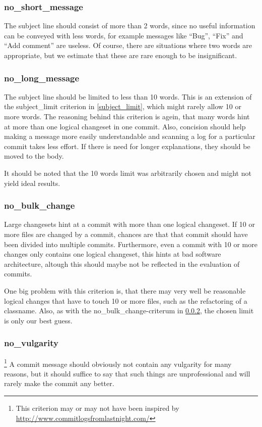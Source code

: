 \subsubsection{no\_short\_message}
\label{subs:no_short_message}
The subject line should consist of more than 2 words, since no useful information can be conveyed with less words, for example messages like ``Bug'', ``Fix'' and ``Add comment'' are useless. Of course, there are situations where two words are appropriate, but we estimate that these are rare enough to be insignificant.

\subsubsection{no\_long\_message}
\label{subs:no_long_message}
The subject line should be limited to less than 10 words. This is an extension of the subject\_limit criterion in \ref{subject_limit}, which might rarely allow 10 or more words. The reasoning behind this criterion is agein, that many words hint at more than one logical changeset in one commit. Also, concision should help making a message more easily understandable and scanning a log for a particular commit takes less effort. If there is need for longer explanations, they should be moved to the body.

It should be noted that the 10 words limit was arbitrarily chosen and might not yield ideal results.

\subsubsection{no\_bulk\_change}
\label{subs:no_bulk_change}
Large changesets hint at a commit with more than one logical changeset. If 10 or more files are changed by a commit, chances are that that commit should have been divided into multiple commits. Furthermore, even a commit with 10 or more changes only contains one logical changeset, this hints at bad software architecture, altough this should maybe not be reflected in the evaluation of commits.

One big problem with this criterion is, that there may very well be reasonable logical changes that have to touch 10 or more files, such as the refactoring of a classname. Also, as with the no\_bulk\_change-criterum in \ref{subs:no_long_message}, the chosen limit is only our best guess.

\subsubsection{no\_vulgarity}
\footnote{This criterion may or may not have been inspired by \url{http://www.commitlogsfromlastnight.com/}}
\label{subs:no_vulgarity}
A commit message should obviously not contain any vulgarity for many reasons, but it should suffice to say that such things are unprofessional and will rarely make the commit any better.

